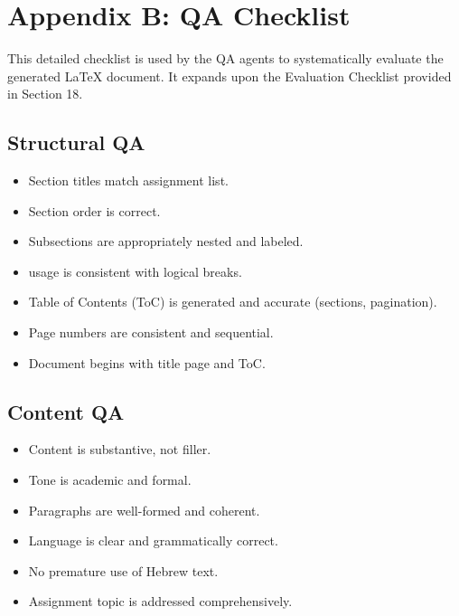 \documentclass{custom-academic-template}
\begin{document}
\section{Appendix B: QA Checklist}
This detailed checklist is used by the QA agents to systematically evaluate the generated LaTeX document. It expands upon the Evaluation Checklist provided in Section 18.

\subsection{Structural QA}
\begin{itemize}
    \item [ ] Section titles match assignment list.
    \item [ ] Section order is correct.
    \item [ ] Subsections are appropriately nested and labeled.
    \item [ ] 	\texttt{\newpage} usage is consistent with logical breaks.
    \item [ ] Table of Contents (ToC) is generated and accurate (sections, pagination).
    \item [ ] Page numbers are consistent and sequential.
    \item [ ] Document begins with title page and ToC.
\end{itemize}

\subsection{Content QA}
\begin{itemize}
    \item [ ] Content is substantive, not filler.
    \item [ ] Tone is academic and formal.
    \item [ ] Paragraphs are well-formed and coherent.
    \item [ ] Language is clear and grammatically correct.
    \item [ ] No premature use of Hebrew text.
    \item [ ] Assignment topic is addressed comprehensively.
\end{itemize}
\end{document}

